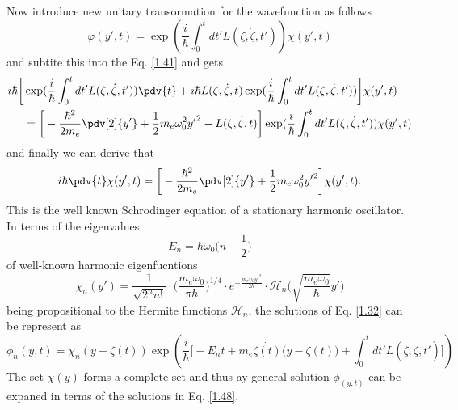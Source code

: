 \noindent
Now introduce new unitary transormation for the wavefunction as follows
\begin{equation} \label{1.43}
    \varphi(y',t) = \exp(\frac{i}{\hbar}\int_0^{t}dt'L(\zeta,\dot{\zeta},t')) \chi(y',t)
\end{equation}
and subtite this into the Eq. \eqref{1.41} and gets
\begin{equation} \label{1.44}
  \begin{aligned}
    i \hbar \bigg[
      & \exp(\frac{i}{\hbar}\int_0^{t}dt'L(\zeta,\dot{\zeta},t')) \pdv{t}
      +
      i \hbar L(\zeta,\dot{\zeta},t) \exp(\frac{i}{\hbar}\int_0^{t}dt'L(\zeta,\dot{\zeta},t'))
    \bigg]\chi(y',t) \\
    & =
    \bigg[
        -  \frac{\hbar^2}{2m_e}\pdv[2]{{y'}}
        + \frac{1}{2} m_e \omega_0^2 {y'}^2
        - L(\zeta,\dot{\zeta},t)
    \bigg] \exp(\frac{i}{\hbar}\int_0^{t}dt'L(\zeta,\dot{\zeta},t')) \chi(y',t)
  \end{aligned}
\end{equation}
and finally we can derive that
\begin{equation} \label{1.45}
  \begin{aligned}
    i \hbar \pdv{t} \chi(y',t)  =
    \bigg[
        -  \frac{\hbar^2}{2m_e}\pdv[2]{{y'}}
        + \frac{1}{2} m_e \omega_0^2 {y'}^2
    \bigg] \chi(y',t).
  \end{aligned}
\end{equation}
This is the well known Schrodinger equation of a stationary harmonic oscillator.
In terms of the eigenvalues
\begin{equation} \label{1.46}
  E_n = \hbar \omega_0 \big(n + \frac{1}{2}\big)
\end{equation}
of well-known harmonic eigenfucntions
\begin{equation} \label{1.47}
  \chi_n(y') = \frac{1}{\sqrt{2^{n}n!}}  \cdot
  \bigg(\frac{m_e\omega_0}{\pi \hbar}\bigg)^{1/4}
  \cdot e^{-\frac{m_e\omega_0 y'^2}{2\hbar}} \cdot
  \mathcal{H}_n \bigg(\sqrt{\frac{m_e \omega_0}{\hbar}}y'\bigg)
\end{equation}
being propositional to the Hermite functions $\mathcal{H}_n$, the solutions of Eq. \eqref{1.32} can be represent as
\begin{equation} \label{1.48}
  \phi_n(y,t) = \chi_n(y - \zeta(t))
  \exp(\frac{i}{\hbar}\bigg[- E_nt +
  m_e\dot{\zeta(t)}\big(y-\zeta(t)\big)
   + \int_0^{t}dt'L(\zeta,\dot{\zeta},t')\bigg])
\end{equation}
The set $\chi(y)$ forms a complete set and thus ay general solution $\phi_(y,t)$ can be expaned in terms of the solutions in Eq. \eqref{1.48}.

